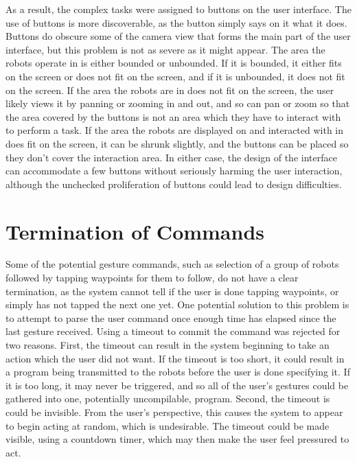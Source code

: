 As a result, the complex tasks were assigned to buttons on the user interface. 
The use of buttons is more discoverable, as the button simply says on it what it does. 
Buttons do obscure some of the camera view that forms the main part of the user interface, but this problem is not as severe as it might appear. 
The area the robots operate in is either bounded or unbounded.
If it is bounded, it either fits on the screen or does not fit on the screen, and if it is unbounded, it does not fit on the screen.
If the area the robots are in does not fit on the screen, the user likely views it by panning or zooming in and out, and so can pan or zoom so that the area covered by the buttons is not an area which they have to interact with to perform a task. 
If the area the robots are displayed on and interacted with in does fit on the screen, it can be shrunk slightly, and the buttons can be placed so they don't cover the interaction area. 
In either case, the design of the interface can accommodate a few buttons without seriously harming the user interaction, although the unchecked proliferation of buttons could lead to design difficulties. 

\section{Termination of Commands}

Some of the potential gesture commands, such as selection of a group of robots followed by tapping waypoints for them to follow, do not have a clear termination, as the system cannot tell if the user is done tapping waypoints, or simply has not tapped the next one yet. 
One potential solution to this problem is to attempt to parse the user command once enough time has elapsed since the last gesture received. 
Using a timeout to commit the command was rejected for two reasons. 
First, the timeout can result in the system beginning to take an action which the user did not want. If the timeout is too short, it could result in a program being transmitted to the robots before the user is done specifying it. 
If it is too long, it may never be triggered, and so all of the user's gestures could be gathered into one, potentially uncompilable, program. 
Second, the timeout is could be invisible. From the user's perspective, this causes the system to appear to begin acting at random, which is undesirable. 
The timeout could be made visible, using a countdown timer, which may then make the user feel pressured to act. 

